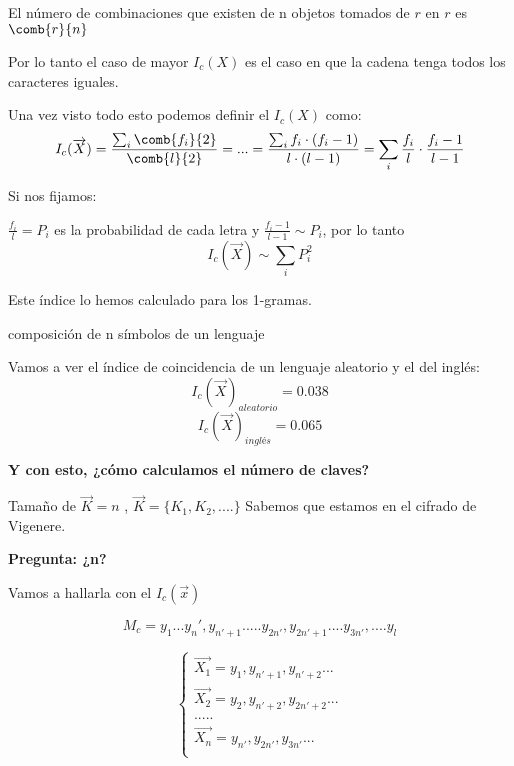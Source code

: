 \begin{enumerate}
\begin{itemize}
\begin{remark}
			El número de combinaciones que existen de n objetos tomados de $r$ en $r$ es $\comb{r}{n}$
		\end{remark}
		

		
		Por lo tanto el caso de mayor $I_c(X)$ es el caso en que la cadena tenga todos los caracteres iguales.
		
		Una vez visto todo esto podemos definir el $I_c(X)$ como:
		$$I_c(\overrightarrow{X}) = \frac{\sum_{i}\comb{f_i}{2}}{\comb{l}{2}} = ... = \frac{\sum_{i} f_i \cdot (f_i -1)}{l\cdot(l-1)} = \sum_{i} \frac{f_i}{l} \cdot \frac{f_i-1}{l-1} $$
		
		Si nos fijamos:
		
		$\frac{f_i}{l} = P_i$ es la probabilidad de cada letra y $\frac{f_i-1}{l-1} \sim P_i$, por lo tanto
		$$I_c(\overrightarrow{X}) \sim \sum_{i} P^2_i$$
		
		Este índice lo hemos calculado para los 1-gramas.
		
		\begin{defn}[n-grama]
 composición de n símbolos de un lenguaje
		\end{defn}
		
		\begin{example}
			Vamos a ver el índice de coincidencia de un lenguaje aleatorio y el del inglés:
			$$I_c(\overrightarrow{X})_{aleatorio} = 0.038$$
			$$I_c(\overrightarrow{X})_{inglés} = 0.065$$
		\end{example}
		
		
	\textbf{Y con esto, ¿cómo calculamos el número de claves?}
	
	\begin{example}
		
		Tamaño de $\overrightarrow{K} = n$ ,	$\overrightarrow{K} = \{K_1, K_2, ....\}$
		Sabemos que estamos en el cifrado de Vigenere.
		
		\textbf{Pregunta: ¿n?}
		
		Vamos a hallarla con el $I_c(\overrightarrow{x})$
		
		$$M_c = y_1...y_n' , y_{n'+1}.....y_{2n'} , y_{2n'+1}....y_{3n'},....y_l$$
		
		$$\begin{cases}
			\overrightarrow{X_1}= y_1, y_{n'+1}, y_{n'+2}...\\
			\overrightarrow{X_2}= y_2, y_{n'+2}, y_{2n'+2}...\\
			.....\\
			\overrightarrow{X_n}= y_{n'}, y_{2n'}, y_{3n'}...\\
		\end{cases}$$
		

\end{example}
\end{itemize}
\end{enumerate}
